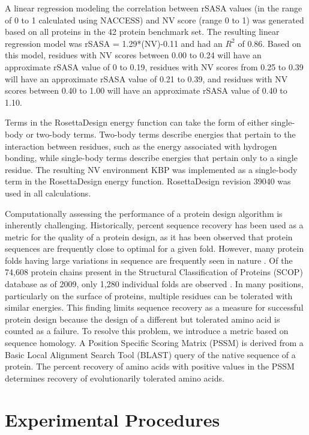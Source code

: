 A linear regression modeling the correlation between rSASA values (in the range of 0 to 1 calculated using NACCESS) and NV score (range 0 to 1) was generated based on all proteins in the 42 protein benchmark set.
The resulting linear regression model was rSASA = 1.29*(NV)-0.11 and had an $R^{2}$ of 0.86.
Based on this model, residues with NV scores between 0.00 to 0.24 will have an approximate rSASA value of 0 to 0.19, residues with NV scores from 0.25 to 0.39 will have an approximate rSASA value of 0.21 to 0.39, and residues with NV scores between 0.40 to 1.00 will have an approximate rSASA value of 0.40 to 1.10.

Terms in the RosettaDesign energy function can take the form of either single-body or two-body terms.
Two-body terms describe energies that pertain to the interaction between residues, such as the energy associated with hydrogen bonding, while single-body terms describe energies that pertain only to a single residue.
The resulting NV environment KBP was implemented as a single-body term in the RosettaDesign energy function.
RosettaDesign revision 39040 was used in all calculations.  

Computationally assessing the performance of a protein design algorithm is inherently challenging.
Historically, percent sequence recovery has been used as a metric for the quality of a protein design, as it has been observed that protein sequences are frequently close to optimal for a given fold\citep{Kuhlman:2000tc}.
However, many protein folds having large variations in sequence are frequently seen in nature \citep{Chothia:1986tm}.
Of the 74,608 protein chains present in the Structural Classification of Proteins (SCOP) database as of 2009, only 1,280 individual folds are observed \citep{Schaeffer:2011fe}.
In many positions, particularly on the surface of proteins, multiple residues can be tolerated with similar energies.
This finding limits sequence recovery as a measure for successful protein design because the design of a different but tolerated amino acid is counted as a failure.
To resolve this problem, we introduce a metric based on sequence homology. A Position Specific Scoring Matrix (PSSM) is derived from a Basic Local Alignment Search Tool (BLAST) query of the native sequence of a protein.
The percent recovery of amino acids with positive values in the PSSM determines recovery of evolutionarily tolerated amino acids. 

\section{Experimental Procedures}

